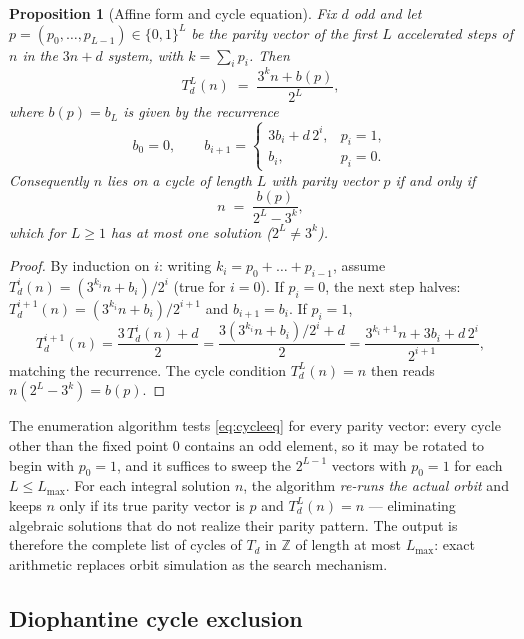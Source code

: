 \documentclass[11pt]{amsart}
\newtheorem{proposition}[theorem]{Proposition}
\theoremstyle{definition}
\theoremstyle{remark}
\newcommand{\Z}{\mathbb{Z}}
\begin{document}
\begin{proposition}[Affine form and cycle equation]\label{prop:cycleform}
Fix $d$ odd and let $p = (p_0,\dots,p_{L-1}) \in \{0,1\}^L$ be the parity vector of the first $L$ accelerated steps of $n$ in the $3n+d$ system, with $k = \sum_i p_i$. Then
\[
T_d^L(n) \;=\; \frac{3^k n + b(p)}{2^L},
\]
where $b(p) = b_L$ is given by the recurrence
\[
b_0 = 0,\qquad b_{i+1} = \begin{cases} 3 b_i + d\, 2^i, & p_i = 1,\\ b_i, & p_i = 0.\end{cases}
\]
Consequently $n$ lies on a cycle of length $L$ with parity vector $p$ if and only if
\begin{equation}\label{eq:cycleeq}
n \;=\; \frac{b(p)}{2^L - 3^k},
\end{equation}
which for $L \geq 1$ has at most one solution ($2^L \neq 3^k$).
\end{proposition}

\begin{proof}
By induction on $i$: writing $k_i = p_0 + \dots + p_{i-1}$, assume $T_d^i(n) = (3^{k_i} n + b_i)/2^i$ (true for $i=0$). If $p_i = 0$, the next step halves: $T_d^{i+1}(n) = (3^{k_i} n + b_i)/2^{i+1}$ and $b_{i+1} = b_i$. If $p_i = 1$,
\[
T_d^{i+1}(n) = \frac{3\,T_d^i(n) + d}{2} = \frac{3(3^{k_i} n + b_i)/2^i + d}{2} = \frac{3^{k_i+1} n + 3b_i + d\,2^i}{2^{i+1}},
\]
matching the recurrence. The cycle condition $T_d^L(n) = n$ then reads $n(2^L - 3^k) = b(p)$.
\end{proof}

The enumeration algorithm tests \eqref{eq:cycleeq} for every parity vector: every cycle other than the fixed point $0$ contains an odd element, so it may be rotated to begin with $p_0 = 1$, and it suffices to sweep the $2^{L-1}$ vectors with $p_0 = 1$ for each $L \le L_{\max}$. For each integral solution $n$, the algorithm \emph{re-runs the actual orbit} and keeps $n$ only if its true parity vector is $p$ and $T_d^L(n) = n$ --- eliminating algebraic solutions that do not realize their parity pattern. The output is therefore the complete list of cycles of $T_d$ in $\Z$ of length at most $L_{\max}$: exact arithmetic replaces orbit simulation as the search mechanism.

\subsection{Diophantine cycle exclusion}\label{sec:exclusion-alg}
\end{document}
